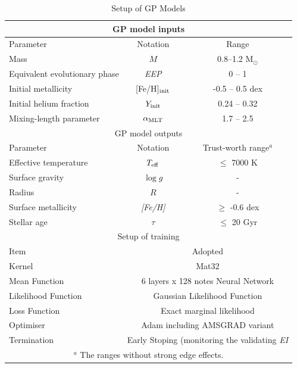 \begin{table}
	\centering
	\caption{Setup of GP Models}
	\label{tab:setup}
	\begin{tabular}{lcc}
		\hline
		\multicolumn{3}{c}{GP model inputs} \\
		 \hline
		 Parameter & Notation &Range \\ 
                  \hline
                   Mass & $M$ & 0.8--1.2 M$_{\odot}$\\
                   Equivalent evolutionary phase & {\it EEP} & 0 -- 1\\
                   Initial metallicity & [Fe/H]$_{\rm init}$ & -0.5 -- 0.5 dex\\
                   Initial helium fraction & $Y_{\rm init}$ & 0.24 -- 0.32 \\ 
                   Mixing-length parameter & $\alpha_{\rm MLT}$& 1.7 -- 2.5\\ 
                   \hline
                   \multicolumn{3}{c}{GP model outputs} \\
                   \hline
                    Parameter & Notation & Trust-worth range$^{a}$ \\ 
                    \hline
                    Effective temperature & $T_{\rm eff}$ & $\leq$ 7000 K  \\ 
                    Surface gravity & $\log g$& - \\
                    Radius & $R$ & - \\ 
                    Surface metallicity & {\it [Fe/H]} & $\geq$ -0.6 dex\\ 
                    Stellar age & $\tau$ & $\leq$ 20 Gyr \\ 
		 \hline
		 \multicolumn{3}{c}{Setup of training} \\
		 \hline
		 Item & \multicolumn{2}{c}{Adopted}\\
		 \hline
		 Kernel & \multicolumn{2}{c}{Mat32}\\
		 Mean Function&  \multicolumn{2}{c}{6 layers x 128 notes Neural Network} \\
		  Likelihood Function & \multicolumn{2}{c}{Gaussian Likelihood Function}\\
		 Loss Function & \multicolumn{2}{c}{Exact marginal likelihood}\\
		 Optimiser & \multicolumn{2}{c}{Adam including AMSGRAD variant}\\
		 Termination&  \multicolumn{2}{c}{Early Stoping (monitoring the validating {\it EI}}) \\
		 \hline
		  \multicolumn{3}{c}{$^a$ The ranges without strong edge effects.} \\
	\end{tabular}
\end{table}

